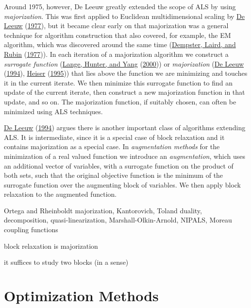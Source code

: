 \documentclass[
  12pt,
]{book}
\begin{document}
Around 1975, however, De Leeuw greatly extended the scope of ALS by using \emph{majorization}. This was first applied to Euclidean multidimensional scaling by \protect\hyperlink{ref-deleeuw_C_77}{De Leeuw} (\protect\hyperlink{ref-deleeuw_C_77}{1977}), but it became clear early on that majorization was a general technique for algorithm construction that also covered, for example, the EM algorithm, which was discovered around the same time (\protect\hyperlink{ref-dempster_laird_rubin_77}{Dempster, Laird, and Rubin} (\protect\hyperlink{ref-dempster_laird_rubin_77}{1977})). In each iteration of a majorization algorithm we construct a \emph{surrogate function} (\protect\hyperlink{ref-lange_hunter_yang_00}{Lange, Hunter, and Yang} (\protect\hyperlink{ref-lange_hunter_yang_00}{2000})) or \emph{majorization} (\protect\hyperlink{ref-deleeuw_C_94c}{De Leeuw} (\protect\hyperlink{ref-deleeuw_C_94c}{1994}), \protect\hyperlink{ref-heiser_95}{Heiser} (\protect\hyperlink{ref-heiser_95}{1995})) that lies above the function we are minimizing and touches it in the current iterate. We then minimize this surrogate function to find an update of the current iterate, then construct a new majorization function in that update, and so on. The majorization function, if suitably chosen, can often be minimized using ALS techniques.

\protect\hyperlink{ref-deleeuw_C_94c}{De Leeuw} (\protect\hyperlink{ref-deleeuw_C_94c}{1994}) argues there is another important class of algorithms extending ALS. It is intermediate, since it is a special case of block relaxation and it contains majorization as a special case. In \emph{augmentation methods} for the minimization of a real valued function we introduce an \emph{augmentation}, which uses an additional vector of variables, with a surrogate function on the product of both sets, such that the original objective function is the minimum of the surrogate function over the augmenting block of variables. We then apply block relaxation to the augmented function.

Ortega and Rheinboldt majorization, Kantorovich,
Toland duality, decomposition, quasi-linearization, Marshall-Olkin-Arnold, NIPALS, Moreau coupling functions

block relaxation is majorization

it suffices to study two blocks (in a sense)

\hypertarget{introduction:optimizationmethods}{%
\section{Optimization Methods}\label{introduction:optimizationmethods}}
\end{document}
